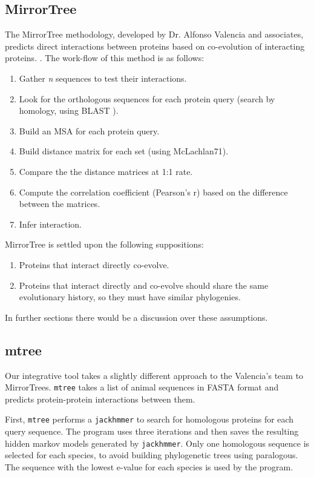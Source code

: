\documentclass[11pt]{article}
\begin{document}
\subsection{MirrorTree}
The MirrorTree methodology, developed by Dr. Alfonso Valencia and associates, predicts direct interactions between proteins based on co-evolution of interacting proteins. \cite{Pazos2001}. The work-flow of this method is as follows:
\begin{enumerate}
\setlength{\itemsep}{1pt}
	\item Gather \textit{n} sequences to test their interactions.
	\item Look for the orthologous sequences for each protein query (search by homology, using BLAST \cite{BLAST}).
	\item Build an MSA for each protein query.
	\item Build distance matrix for each set (using McLachlan71).
	\item Compare the the distance matrices at 1:1 rate.
	\item Compute the correlation coefficient (Pearson's r) based on the difference between the matrices.
	\item Infer interaction.
\end{enumerate}
MirrorTree is settled upon the following suppositions:
\begin{enumerate}
\setlength{\itemsep}{1pt}
	\item Proteins that interact directly co-evolve.
	\item Proteins that interact directly and co-evolve should share the same evolutionary history, so they must have similar phylogenies.
\end{enumerate}
In further sections there would be a discussion over these assumptions.

\subsection{mtree}

Our integrative tool takes a slightly different approach to the Valencia's team to MirrorTrees. \texttt{mtree} takes a list of animal sequences in FASTA format and predicts protein-protein interactions between them.

First, \texttt{mtree} performs a \texttt{jackhmmer} to search for homologous proteins for each query sequence. The program uses three iterations and then saves the resulting hidden markov models generated by \texttt{jackhmmer}. Only one homologous sequence is selected for each species, to avoid building phylogenetic trees using paralogous. The sequence with the lowest e-value for each species is used by the program.
\end{document}
